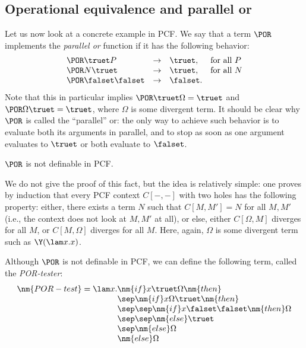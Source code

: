 \documentclass[12pt]{article}
\begin{document}
\subsection{Operational equivalence and parallel or}

Let us now look at a concrete example in PCF. We say that a term $\POR$
implements the {\em parallel or} function if it has the following
behavior:
\[ \begin{array} {llll}
  \POR\truet P &\to& \truet, &\mbox{for all $P$} \\
  \POR N\truet &\to& \truet, &\mbox{for all $N$} \\
  \POR\falset\falset &\to& \falset.
\end{array}
\]
Note that this in particular implies $\POR\truet\Omega=\truet$ and
$\POR\Omega\truet=\truet$, where $\Omega$ is some divergent term. It should
be clear why $\POR$ is called the ``parallel'' or: the only way to
achieve such behavior is to evaluate both its arguments in parallel,
and to stop as soon as one argument evaluates to $\truet$ or both
evaluate to $\falset$.

\begin{proposition}
  $\POR$ is not definable in PCF.
\end{proposition}

We do not give the proof of this fact, but the idea is relatively
simple: one proves by induction that every PCF context $C[-,-]$ with
two holes has the following property: either, there exists a term $N$
such that $C[M,M']=N$ for all $M,M'$ (i.e., the context does not look
at $M,M'$ at all), or else, either $C[\Omega,M]$ diverges for all $M$,
or $C[M,\Omega]$ diverges for all $M$. Here, again, $\Omega$ is some
divergent term such as $\Y(\lam x.x)$. 

Although $\POR$ is not definable in PCF, we can define the following
term, called the {\em POR-tester}:
\[ \begin{array}{l@{}l}
  \nm{POR-test} = \lam x. 
  &            \nm{if} x \truet\Omega \nm{then} \\
  &\sep            \nm{if} x\Omega\truet\nm{then}\\
  &\sep\sep            \nm{if} x\falset\falset\nm{then}\Omega\\
  &\sep\sep            \nm{else}\truet\\
  &\sep            \nm{else}\Omega \\
  &            \nm{else}\Omega
\end{array}
\]
\end{document}
